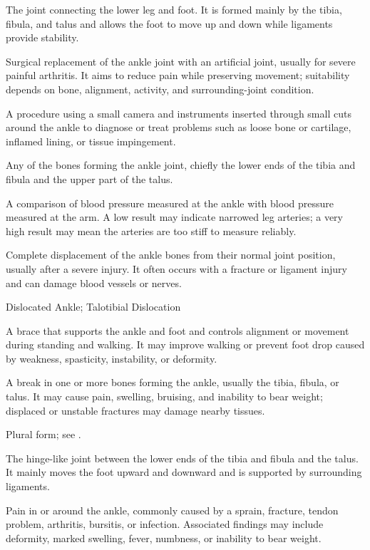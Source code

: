  The joint connecting the lower leg and foot. It is formed mainly by the tibia, fibula, and talus and allows the foot to move up and down while ligaments provide stability.

 Surgical replacement of the ankle joint with an artificial joint, usually for severe painful arthritis. It aims to reduce pain while preserving movement; suitability depends on bone, alignment, activity, and surrounding-joint condition.

 A procedure using a small camera and instruments inserted through small cuts around the ankle to diagnose or treat problems such as loose bone or cartilage, inflamed lining, or tissue impingement.

 Any of the bones forming the ankle joint, chiefly the lower ends of the tibia and fibula and the upper part of the talus.

 A comparison of blood pressure measured at the ankle with blood pressure measured at the arm. A low result may indicate narrowed leg arteries; a very high result may mean the arteries are too stiff to measure reliably.

 Complete displacement of the ankle bones from their normal joint position, usually after a severe injury. It often occurs with a fracture or ligament injury and can damage blood vessels or nerves.

\synonyms
Dislocated Ankle; Talotibial Dislocation

 A brace that supports the ankle and foot and controls alignment or movement during standing and walking. It may improve walking or prevent foot drop caused by weakness, spasticity, instability, or deformity.

 A break in one or more bones forming the ankle, usually the tibia, fibula, or talus. It may cause pain, swelling, bruising, and inability to bear weight; displaced or unstable fractures may damage nearby tissues.

 Plural form; see .

 The hinge-like joint between the lower ends of the tibia and fibula and the talus. It mainly moves the foot upward and downward and is supported by surrounding ligaments.

 Pain in or around the ankle, commonly caused by a sprain, fracture, tendon problem, arthritis, bursitis, or infection. Associated findings may include deformity, marked swelling, fever, numbness, or inability to bear weight.


